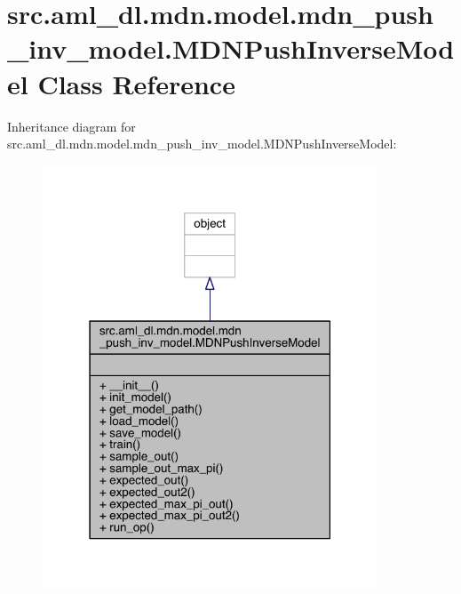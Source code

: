 \hypertarget{classsrc_1_1aml__dl_1_1mdn_1_1model_1_1mdn__push__inv__model_1_1_m_d_n_push_inverse_model}{}\section{src.\+aml\+\_\+dl.\+mdn.\+model.\+mdn\+\_\+push\+\_\+inv\+\_\+model.\+M\+D\+N\+Push\+Inverse\+Model Class Reference}
\label{classsrc_1_1aml__dl_1_1mdn_1_1model_1_1mdn__push__inv__model_1_1_m_d_n_push_inverse_model}


Inheritance diagram for src.\+aml\+\_\+dl.\+mdn.\+model.\+mdn\+\_\+push\+\_\+inv\+\_\+model.\+M\+D\+N\+Push\+Inverse\+Model\+:\nopagebreak
\begin{figure}[H]
\begin{center}
\leavevmode
\includegraphics[width=283pt]{classsrc_1_1aml__dl_1_1mdn_1_1model_1_1mdn__push__inv__model_1_1_m_d_n_push_inverse_model__inherit__graph}
\end{center}
\end{figure}


